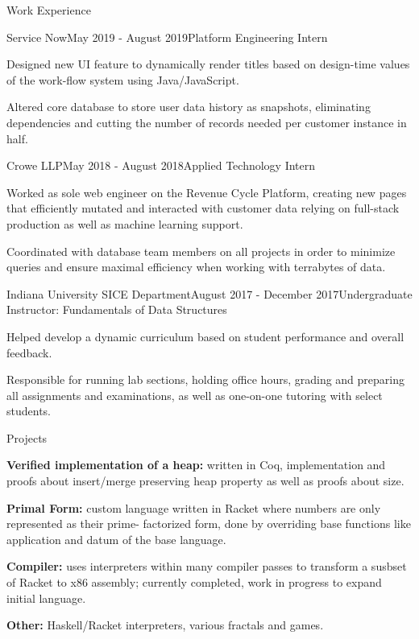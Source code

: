 \documentclass{resume} %
\begin{document}
\begin{rSection}{Work Experience}

	\begin{rSubsection}{Service Now}{May 2019 - August 2019}{Platform Engineering Intern}{}
		\item Designed new UI feature to dynamically render titles based on design-time values of the work-flow system using Java/JavaScript.
		\item Altered core database to store user data history as snapshots, eliminating dependencies and cutting the number of records needed per customer instance in half.
	\end{rSubsection}

	\begin{rSubsection}{Crowe LLP}{May 2018 - August 2018}{Applied Technology Intern}{}
		\item Worked as sole web engineer on the Revenue Cycle Platform, creating new pages that efficiently mutated and interacted with customer data relying on full-stack production as well as machine learning support.
		\item Coordinated with database team members on all projects in order to minimize queries and ensure maximal efficiency when working with terrabytes of data.
	\end{rSubsection}

	\begin{rSubsection}{Indiana University SICE Department}{August 2017 - December 2017}{Undergraduate Instructor: Fundamentals of Data Structures}{}
		\item Helped develop a dynamic curriculum based on student performance and overall feedback.
		\item Responsible for running lab sections, holding office hours, grading and preparing all assignments and examinations, as well as one-on-one tutoring with select students.
	\end{rSubsection}

\end{rSection}

\begin{rSection}{Projects} \itemsep -3pt
	\item \textbf{Verified implementation of a heap:} written in Coq, implementation and proofs about insert/merge preserving heap property as well as proofs about size.
	\item \textbf{Primal Form:} custom language written in Racket where numbers are only represented as their prime- factorized form, done by overriding base functions like application and datum of the base language.
	\item \textbf{Compiler:} uses interpreters within many compiler passes to transform a susbset of Racket to x86 assembly; currently completed, work in progress to expand initial language.
	\item \textbf{Other:} Haskell/Racket interpreters, various fractals and games.
\end{rSection}
\end{document}
